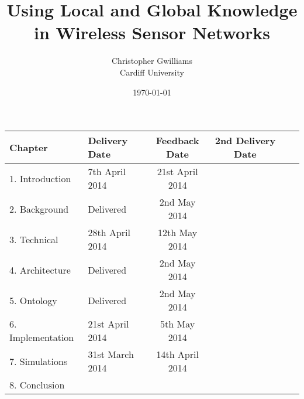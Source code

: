 \documentclass[12pt, a4paper]{report}
\begin{document}
\title{Using Local and Global Knowledge in Wireless Sensor Networks}
\author{Christopher Gwilliams\\Cardiff University}
\date{\today}
\maketitle 

		\begin{table*}
			\hfill{}
			\begin{tabular}{|l|l|c|c|c|c|}
				\hline
					Chapter & Delivery Date & Feedback Date & 2nd Delivery Date \\
				\hline
					1. Introduction & 7th April 2014 & 21st April 2014 & \\
					2. Background & Delivered & 2nd May 2014 & \\
					3. Technical & 28th April 2014 & 12th May 2014 & \\
					4. Architecture & Delivered & 2nd May 2014 & \\
					5. Ontology & Delivered & 2nd May 2014 & \\
					6. Implementation & 21st April 2014 & 5th May 2014 & \\
					7. Simulations & 31st March 2014 & 14th April 2014 & \\
					8. Conclusion & & & \\			
				\hline
			\end{tabular}
			\hfill{}
		\end{table*}		

\tableofcontents
\listoffigures
\listoftables
\end{document}
